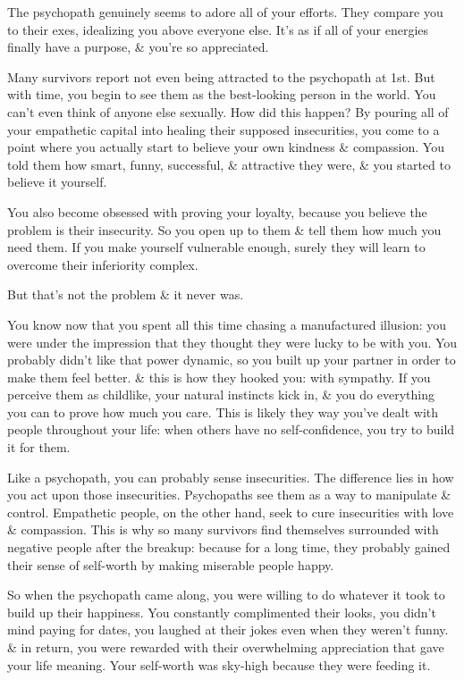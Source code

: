 \documentclass{article}
\numberwithin{equation}{section}
\begin{document}
The psychopath genuinely seems to adore all of your efforts. They compare you to their exes, idealizing you above everyone else. It's as if all of your energies finally have a purpose, \& you're so appreciated.

Many survivors report not even being attracted to the psychopath at 1st. But with time, you begin to see them as the best-looking person in the world. You can't even think of anyone else sexually. How did this happen? By pouring all of your empathetic capital into healing their supposed insecurities, you come to a point where you actually start to believe your own kindness \& compassion. You told them how smart, funny, successful, \& attractive they were, \& you started to believe it yourself.

You also become obsessed with proving your loyalty, because you believe the problem is their insecurity. So you open up to them \& tell them how much you need them. If you make yourself vulnerable enough, surely they will learn to overcome their inferiority complex.

But that's not the problem \& it never was.

You know now that you spent all this time chasing a manufactured illusion: you were under the impression that they thought they were lucky to be with you. You probably didn't like that power dynamic, so you built up your partner in order to make them feel better. \& this is how they hooked you: with sympathy. If you perceive them as childlike, your natural instincts kick in, \& you do everything you can to prove how much you care. This is likely they way you've dealt with people throughout your life: when others have no self-confidence, you try to build it for them.

Like a psychopath, you can probably sense insecurities. The difference lies in how you act upon those insecurities. Psychopaths see them as a way to manipulate \& control. Empathetic people, on the other hand, seek to cure insecurities with love \& compassion. This is why so many survivors find themselves surrounded with negative people after the breakup: because for a long time, they probably gained their sense of self-worth by making miserable people happy.

So when the psychopath came along, you were willing to do whatever it took to build up their happiness. You constantly complimented their looks, you didn't mind paying for dates, you laughed at their jokes even when they weren't funny. \& in return, you were rewarded with their overwhelming appreciation that gave your life meaning. Your self-worth was sky-high because they were feeding it.
\end{document}
